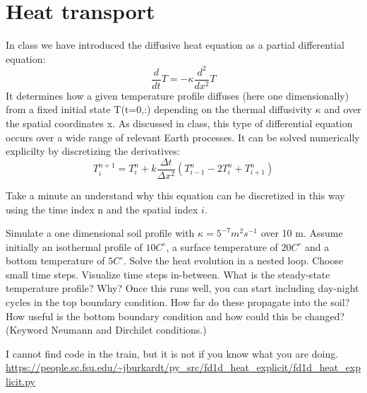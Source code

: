 \section{Heat transport}
In class we have introduced the diffusive heat equation as a partial differential equation:
$$
\frac{d}{dt}T = -\kappa\frac{d^2}{dx^2}T
$$
It determines how a given temperature profile diffuses (here one dimensionally) from a fixed initial state T(t=0,:) depending on the thermal diffusivity $\kappa$ and over the spatial coordinates x. As discussed in class, this type of differential equation occurs over a wide range of relevant Earth processes. It can be solved numerically explicilty by discretizing the derivatives:
$$
T^{n+1}_{i} = T^{n}_{i} + k\frac{\Delta t}{\Delta x^2}\left(T^{n}_{i-1} - 2T^{n}_{i}+T^{n}_{i+1} \right)
$$

Take a minute an understand why this equation can be discretized in this way using the time index n and the spatial index $i$. 

Simulate a one dimensional soil profile with $\kappa = 5^{-7} m^2 s^{-1}$ over 10 m. Assume initially an isothermal profile of $10 C^{\circ}$, a surface temperature of $20 C^{\circ}$ and a bottom temperature of $5 C^{\circ}$. Solve the heat evolution in a nested loop. Choose small time steps. Visualize time steps in-between. What is the steady-state temperature profile? Why? Once this runs well, you can start including day-night cycles in the top boundary condition. How far do these propagate into the soil? How useful is the bottom boundary condition and how could this be changed? (Keyword Neumann and Dirchilet conditions.)
\begin{tcolorbox}[enhanced jigsaw,breakable,pad at break*=1mm,
    colback=blue!5!white,colframe=babyblueeyes,title=Solutions,
    watermark color=white]

\ifanswers
I cannot find code in the train, but it is not if you know what you are doing. 
\url{https://people.sc.fsu.edu/~jburkardt/py_src/fd1d_heat_explicit/fd1d_heat_explicit.py}
\end{tcolorbox}
\fi
